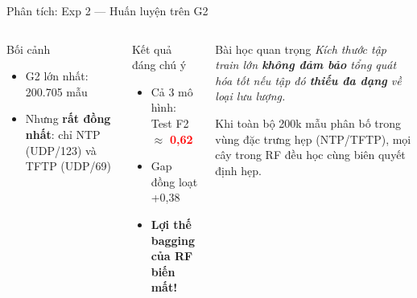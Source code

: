 \documentclass[aspectratio=169,12pt]{beamer}
\newcommand{\bad}[1]{\textcolor{red}{\textbf{#1}}}
\begin{document}
\begin{frame}{Phân tích: Exp 2 --- Huấn luyện trên G2}
  \begin{columns}[T]
      \begin{block}{Bối cảnh}
        \begin{itemize}
          \item G2 lớn nhất: 200.705 mẫu
          \item Nhưng \textbf{rất đồng nhất}: chỉ NTP (UDP/123) và TFTP (UDP/69)
        \end{itemize}
      \end{block}
      \vspace{0.3em}
      \begin{alertblock}{Kết quả đáng chú ý}
        \begin{itemize}
          \item Cả 3 mô hình: Test F2 $\approx$ \bad{0,62}
          \item Gap đồng loạt +0,38
          \item \textbf{Lợi thế bagging của RF biến mất!}
        \end{itemize}
      \end{alertblock}
      \begin{block}{Bài học quan trọng}
        \textit{Kích thước tập train lớn \textbf{không đảm bảo} tổng quát hóa tốt nếu tập đó \textbf{thiếu đa dạng} về loại lưu lượng.}
        \vspace{0.4em}

        Khi toàn bộ 200k mẫu phân bố trong vùng đặc trưng hẹp (NTP/TFTP), mọi cây trong RF đều học cùng biên quyết định hẹp.
      \end{block}
  \end{columns}
\end{frame}
\end{document}
